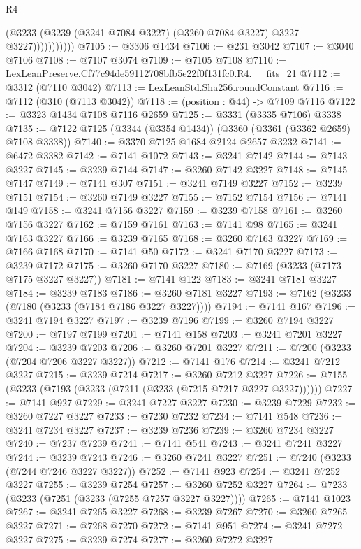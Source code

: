 \begin{lexlean}{R4}
\begin{coremodule}
                      (@3233 (@3239 (@3241 @7084 @3227) (@3260 @7084 @3227) @3227 @3227)))))))))))
@7105 := @3306 @1434
@7106 := @231 @3042
@7107 := @3040 @7106
@7108 := @7107 @3074
@7109 := @7105 @7108
@7110 := LexLeanPreserve.Cf77c94de59112708bfb5e22f0f131fc0.R4.__fits_21
@7112 := @3312 (@7110 @3042)
@7113 := LexLeanStd.Sha256.roundConstant
@7116 := @7112 (@310 (@7113 @3042))
@7118 := (position : @44) -> @7109 @7116
@7122 := @3323 @1434 @7108 @7116 @2659
@7125 := @3331 (@3335 @7106) @3338
@7135 := @7122 @7125 (@3344 (@3354 @1434)) (@3360 (@3361 (@3362 @2659) @7108 @3338))
@7140 := @3370 @7125 @1684 @2124 @2657 @3232
@7141 := @6472 @3382
@7142 := @7141 @1072
@7143 := @3241 @7142
@7144 := @7143 @3227
@7145 := @3239 @7144
@7147 := @3260 @7142 @3227
@7148 := @7145 @7147
@7149 := @7141 @307
@7151 := @3241 @7149 @3227
@7152 := @3239 @7151
@7154 := @3260 @7149 @3227
@7155 := @7152 @7154
@7156 := @7141 @149
@7158 := @3241 @7156 @3227
@7159 := @3239 @7158
@7161 := @3260 @7156 @3227
@7162 := @7159 @7161
@7163 := @7141 @98
@7165 := @3241 @7163 @3227
@7166 := @3239 @7165
@7168 := @3260 @7163 @3227
@7169 := @7166 @7168
@7170 := @7141 @50
@7172 := @3241 @7170 @3227
@7173 := @3239 @7172
@7175 := @3260 @7170 @3227
@7180 := @7169 (@3233 (@7173 @7175 @3227 @3227))
@7181 := @7141 @122
@7183 := @3241 @7181 @3227
@7184 := @3239 @7183
@7186 := @3260 @7181 @3227
@7193 := @7162 (@3233 (@7180 (@3233 (@7184 @7186 @3227 @3227))))
@7194 := @7141 @167
@7196 := @3241 @7194 @3227
@7197 := @3239 @7196
@7199 := @3260 @7194 @3227
@7200 := @7197 @7199
@7201 := @7141 @158
@7203 := @3241 @7201 @3227
@7204 := @3239 @7203
@7206 := @3260 @7201 @3227
@7211 := @7200 (@3233 (@7204 @7206 @3227 @3227))
@7212 := @7141 @176
@7214 := @3241 @7212 @3227
@7215 := @3239 @7214
@7217 := @3260 @7212 @3227
@7226 := @7155 (@3233 (@7193 (@3233 (@7211 (@3233 (@7215 @7217 @3227 @3227))))))
@7227 := @7141 @927
@7229 := @3241 @7227 @3227
@7230 := @3239 @7229
@7232 := @3260 @7227 @3227
@7233 := @7230 @7232
@7234 := @7141 @548
@7236 := @3241 @7234 @3227
@7237 := @3239 @7236
@7239 := @3260 @7234 @3227
@7240 := @7237 @7239
@7241 := @7141 @541
@7243 := @3241 @7241 @3227
@7244 := @3239 @7243
@7246 := @3260 @7241 @3227
@7251 := @7240 (@3233 (@7244 @7246 @3227 @3227))
@7252 := @7141 @923
@7254 := @3241 @7252 @3227
@7255 := @3239 @7254
@7257 := @3260 @7252 @3227
@7264 := @7233 (@3233 (@7251 (@3233 (@7255 @7257 @3227 @3227))))
@7265 := @7141 @1023
@7267 := @3241 @7265 @3227
@7268 := @3239 @7267
@7270 := @3260 @7265 @3227
@7271 := @7268 @7270
@7272 := @7141 @951
@7274 := @3241 @7272 @3227
@7275 := @3239 @7274
@7277 := @3260 @7272 @3227

\end{coremodule}
\end{lexlean}
